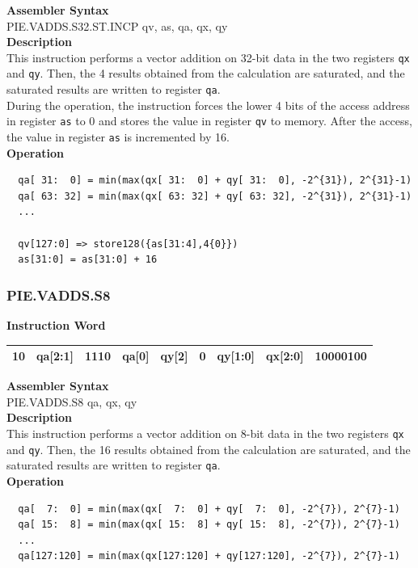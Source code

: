 \textbf{Assembler Syntax} \\
PIE.VADDS.S32.ST.INCP qv, as, qa, qx, qy \\
\textbf{Description} \\
This instruction performs a vector addition on 32-bit data in the two registers \lstinline{qx} and \lstinline{qy}. Then, the 4 results obtained from the calculation are saturated, and the saturated results are written to register \lstinline{qa}. \\ During the operation, the instruction forces the lower 4 bits of the access address in register \lstinline{as} to 0 and stores the value in register \lstinline{qv} to memory. After the access, the value in register \lstinline{as} is incremented by 16.\\
\textbf{Operation}
\begin{lstlisting}
  qa[ 31:  0] = min(max(qx[ 31:  0] + qy[ 31:  0], -2^{31}), 2^{31}-1)
  qa[ 63: 32] = min(max(qx[ 63: 32] + qy[ 63: 32], -2^{31}), 2^{31}-1)
  ...

  qv[127:0] => store128({as[31:4],4{0}})
  as[31:0] = as[31:0] + 16
\end{lstlisting}

\newpage
\subsubsection{PIE.VADDS.S8}\label{instruction:PIEVADDSS8}
\setlength\tabcolsep{6pt}
\textbf{Instruction Word} \\
\begin{tabular}{|c|c|c|c|c|c|c|c|c|}
	\hline
	10 & qa[2:1] & 1110 & qa[0] & qy[2] & 0 & qy[1:0] & qx[2:0] & 10000100 \\
	\hline
\end{tabular}

\textbf{Assembler Syntax} \\
PIE.VADDS.S8 qa, qx, qy \\
\textbf{Description} \\
This instruction performs a vector addition on 8-bit data in the two registers \lstinline{qx} and \lstinline{qy}. Then, the 16 results obtained from the calculation are saturated, and the saturated results are written to register \lstinline{qa}.\\
\textbf{Operation}
\begin{lstlisting}
  qa[  7:  0] = min(max(qx[  7:  0] + qy[  7:  0], -2^{7}), 2^{7}-1)
  qa[ 15:  8] = min(max(qx[ 15:  8] + qy[ 15:  8], -2^{7}), 2^{7}-1)
  ...
  qa[127:120] = min(max(qx[127:120] + qy[127:120], -2^{7}), 2^{7}-1)
\end{lstlisting}

